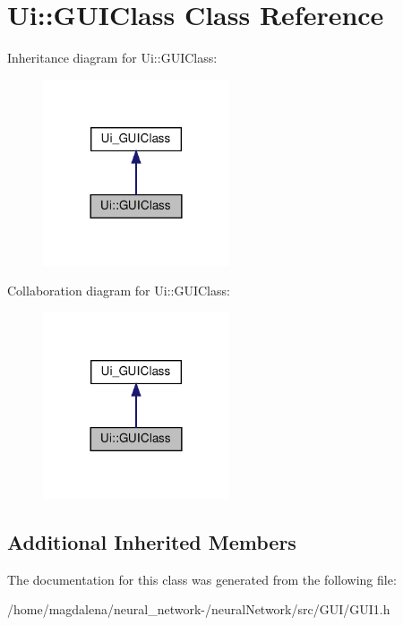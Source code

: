 \hypertarget{classUi_1_1GUIClass}{}\section{Ui\+:\+:G\+U\+I\+Class Class Reference}
\label{classUi_1_1GUIClass}


Inheritance diagram for Ui\+:\+:G\+U\+I\+Class\+:
\nopagebreak
\begin{figure}[H]
\begin{center}
\leavevmode
\includegraphics[width=156pt]{classUi_1_1GUIClass__inherit__graph}
\end{center}
\end{figure}


Collaboration diagram for Ui\+:\+:G\+U\+I\+Class\+:
\nopagebreak
\begin{figure}[H]
\begin{center}
\leavevmode
\includegraphics[width=156pt]{classUi_1_1GUIClass__coll__graph}
\end{center}
\end{figure}
\subsection*{Additional Inherited Members}


The documentation for this class was generated from the following file\+:\begin{DoxyCompactItemize}
\item 
/home/magdalena/neural\+\_\+network-\//neural\+Network/src/\+G\+U\+I/G\+U\+I1.\+h\end{DoxyCompactItemize}
